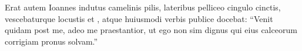 \documentclass[12pt]{article}
\newcommand{\bv}[1]{\linenumannotation{#1}}
\begin{document}
	\beginnumbering
	\pstart
		\bv{6} Erat autem Ioannes indutus camelinis pilis, lateribus pelliceo cingulo cinctis, vescebaturque locustis et , atque huiusmodi verbis publice docebat:\bv{7} “Venit quidam post me, adeo me praestantior, ut ego non sim dignus qui eius calceorum corrigiam pronus solvam.”
	\pend
	\endnumbering
\end{document}
